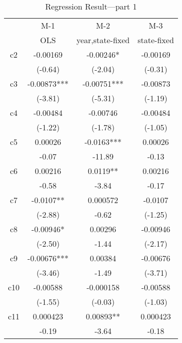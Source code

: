 \begin{table}[htbp]
    \centering
    \caption{Regression Result---part 1}
    \begin{tabular}{cccc}
        \toprule
                                         & M-1         & M-2              & M-3         \\
                                         & OLS         & year,state-fixed & state-fixed \\
        \midrule
        \multicolumn{1}{p{7.355em}}{c2}  & -0.00169    & -0.00246*        & -0.00169    \\
                                         & (-0.64)     & (-2.04)          & (-0.31)     \\
        \multicolumn{1}{p{7.355em}}{c3}  & -0.00873*** & -0.00751***      & -0.00873    \\
                                         & (-3.81)     & (-5.31)          & (-1.19)     \\
        \multicolumn{1}{p{7.355em}}{c4}  & -0.00484    & -0.00746         & -0.00484    \\
                                         & (-1.22)     & (-1.78)          & (-1.05)     \\
        \multicolumn{1}{p{7.355em}}{c5}  & 0.00026     & -0.0163***       & 0.00026     \\
                                         & -0.07       & -11.89           & -0.13       \\
        \multicolumn{1}{p{7.355em}}{c6}  & 0.00216     & 0.0119**         & 0.00216     \\
                                         & -0.58       & -3.84            & -0.17       \\
        \multicolumn{1}{p{7.355em}}{c7}  & -0.0107**   & 0.000572         & -0.0107     \\
                                         & (-2.88)     & -0.62            & (-1.25)     \\
        \multicolumn{1}{p{7.355em}}{c8}  & -0.00946*   & 0.00296          & -0.00946    \\
                                         & (-2.50)     & -1.44            & (-2.17)     \\
        \multicolumn{1}{p{7.355em}}{c9}  & -0.00676*** & 0.00384          & -0.00676    \\
                                         & (-3.46)     & -1.49            & (-3.71)     \\
        \multicolumn{1}{p{7.355em}}{c10} & -0.00588    & -0.000158        & -0.00588    \\
                                         & (-1.55)     & (-0.03)          & (-1.03)     \\
        \multicolumn{1}{p{7.355em}}{c11} & 0.000423    & 0.00893**        & 0.000423    \\
                                         & -0.19       & -3.64            & -0.18       \\
        \bottomrule
    \end{tabular}%
    \label{Table 2.7}%
\end{table}%
